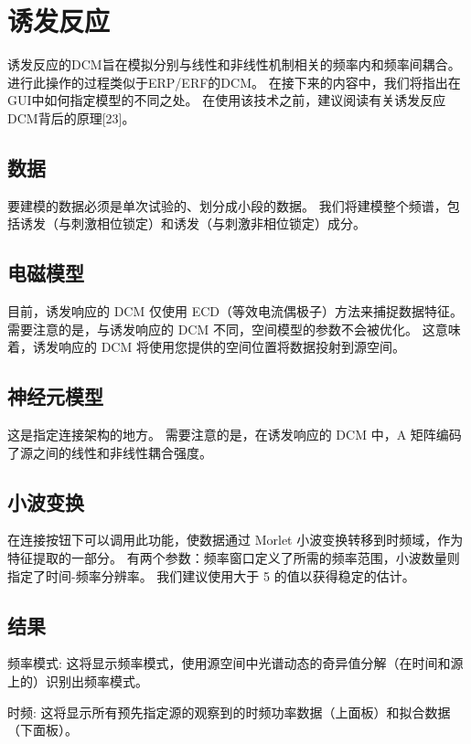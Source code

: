 \section{诱发反应}

诱发反应的DCM旨在模拟分别与线性和非线性机制相关的频率内和频率间耦合。
进行此操作的过程类似于ERP/ERF的DCM。
在接下来的内容中，我们将指出在GUI中如何指定模型的不同之处。
在使用该技术之前，建议阅读有关诱发反应DCM背后的原理[23]。


\subsection{数据}

要建模的数据必须是单次试验的、划分成小段的数据。
我们将建模整个频谱，包括诱发（与刺激相位锁定）和诱发（与刺激非相位锁定）成分。


\subsection{电磁模型}

目前，诱发响应的 DCM 仅使用 ECD（等效电流偶极子）方法来捕捉数据特征。
需要注意的是，与诱发响应的 DCM 不同，空间模型的参数不会被优化。
这意味着，诱发响应的 DCM 将使用您提供的空间位置将数据投射到源空间。


\subsection{神经元模型}

这是指定连接架构的地方。
需要注意的是，在诱发响应的 DCM 中，A 矩阵编码了源之间的线性和非线性耦合强度。


\subsection{小波变换}

在连接按钮下可以调用此功能，使数据通过 Morlet 小波变换转移到时频域，作为特征提取的一部分。
有两个参数：频率窗口定义了所需的频率范围，小波数量则指定了时间-频率分辨率。
我们建议使用大于 5 的值以获得稳定的估计。


\subsection{结果}

频率模式:
这将显示频率模式，使用源空间中光谱动态的奇异值分解（在时间和源上的）识别出频率模式。

时频:
这将显示所有预先指定源的观察到的时频功率数据（上面板）和拟合数据（下面板）。

